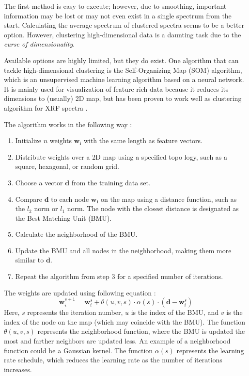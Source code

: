 The first method is easy to execute; however, due to smoothing, important information may be lost or may not even exist in a single spectrum from the start. 
Calculating the average spectrum of clustered spectra seems to be a better option. 
However, clustering high-dimensional data is a daunting task due to the \emph{curse of dimensionality}.

Available options are highly limited, but they do exist. 
One algorithm that can tackle high-dimensional clustering is the Self-Organizing Map (SOM) algorithm, which is an unsupervised machine learning algorithm based on a neural network. 
It is mainly used for visualization of feature-rich data because it reduces its dimensions to (usually) 2D map, but has been proven to work well as clustering algorithm for XRF spectra \cite{Kogou2020}.

The algorithm works in the following way \cite{somTutorial}: 
\begin{enumerate}
    \item Initialize $n$ weights $\mathbf{w_i}$ with the same length as feature vectors.
    \item Distribute weights over a 2D map using a specified topo logy, such as a square, hexagonal, or random grid.
    \item Choose a vector $\mathbf{d}$ from the training data set.
    \item Compare $\mathbf{d}$ to each node $\mathbf{w_i}$ on the map using a distance function, such as the $l_2$ norm or $l_1$ norm. The node with the closest distance is designated as the Best Matching Unit (BMU).
    \item Calculate the neighborhood of the BMU.
    \item Update the BMU and all nodes in the neighborhood, making them more similar to $\mathbf{d}$.
    \item Repeat the algorithm from step 3 for a specified number of iterations.
\end{enumerate}

The weights are updated using following equation \cite{somWikipedia}:
\[\mathbf{w}_i^{s+1} = \mathbf{w}_i^s + \theta(u, v, s) \cdot \alpha(s) \cdot (\mathbf{d} - \mathbf{w}_i^s)\]  
Here, $s$ represents the iteration number, $u$ is the index of the BMU, and $v$ is the index of the node on the map (which may coincide with the BMU). 
The function $\theta(u, v, s)$ represents the neighborhood function, where the BMU is updated the most and farther neighbors are updated less. 
An example of a neighborhood function could be a Gaussian kernel. 
The function $\alpha(s)$ represents the learning rate schedule, which reduces the learning rate as the number of iterations increases.

